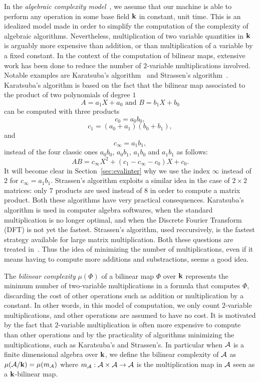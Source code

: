 In the \emph{algebraic complexity model}~\cite{BCS13}, we assume that our
machine is able to perform any operation in some base field $\mathbf{k}$ in constant,
unit time. This is an idealized model made in order to simplify the
computation of the complexity of algebraic algorithms. Nevertheless,
multiplication of two variable quantities in $\mathbf{k}$ is arguably more expensive
than addition, or than multiplication of a variable by a fixed constant. In the
context of the computation of bilinear maps, extensive work has been done to
reduce the number of $2$-variable multiplications involved. Notable examples are
Karatsuba's algorithm~\cite{Karatsuba63} and
Strassen's algorithm~\cite{Strassen69}. Karatsuba's algorithm is
based on the fact that the bilinear map associated to the product of two
polynomials of degree $1$
\[
  A = a_1 X + a_0\text{ and }B = b_1 X + b_0
\]
can be computed with three products
\[
  c_0 = a_0b_0,
\]
\[
  c_1 = (a_0+a_1)(b_0+b_1),
\]
and
\[
  c_\infty = a_1b_1,
\]
instead
of the four classic ones $a_0b_0$, $a_0b_1$, $a_1b_0$ and $a_1b_1$ as follows:
\[
  AB = c_\infty X^2 + (c_1-c_\infty-c_0) X + c_0.
\]
It will become clear in Section~\ref{sec:evalinter} why we use the index
$\infty$ instead of $2$ for $c_\infty = a_1b_1$. Strassen's algorithm
exploits a similar idea in the case of $2\times2$ matrices: only $7$ products
are used instead of $8$ in order to compute a matrix product. Both these
algorithms have very practical consequences. Karatsuba's algorithm is used in
computer algebra softwares, when the standard multiplication is no longer
optimal, and when the Discrete Fourier Transform (DFT) is not yet the fastest.
Strassen's algorithm, used reccursively, is the fastest strategy available for
large matrix multiplication. Both these questions are treated in~\cite{GG13}.
Thus the idea of minimizing the number of multiplications, even if it means
having to compute more additions and substractions, seems a good idea.

The \emph{bilinear complexity}
$\mu(\Phi)$ of a bilinear map $\Phi$ over $\mathbf{k}$ represents the minimum number of two-variable
multiplications in a formula that computes $\Phi$, discarding the cost of other
operations such as addition or multiplication by a constant. In other words, in
this model of computation, we only count $2$-variable multiplications, and other
operations are assumed to have no cost. It is motivated by the fact that
$2$-variable multiplication is often more expensive to compute than other
operations and by the practicality of algorithms minimizing the multiplications,
such as Karatsuba's and Strassen's.
In particular when $\mathcal{A}$ is a finite dimensional algebra over $\mathbf{k}$,
we define the bilinear complexity of $\mathcal{A}$ as $\mu(\mathcal{A}/\mathbf{k})=\mu(m_{\mathcal{A}})$
where $m_{\mathcal{A}}:\mathcal{A}\times\mathcal{A}\to\mathcal{A}$ is the multiplication map in $\mathcal{A}$ seen
as a $\mathbf{k}$-bilinear map.

